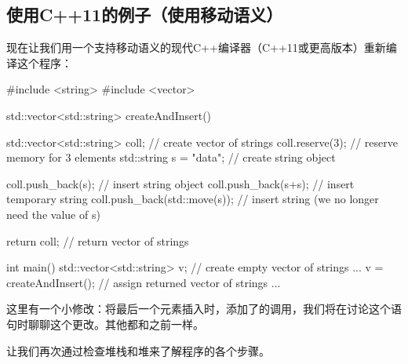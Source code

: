 \subsection{使用C++11的例子（使用移动语义）}

现在让我们用一个支持移动语义的现代C++编译器（C++11或更高版本）重新编译这个程序：

\begin{cppcode}
#include <string>
#include <vector>

std::vector<std::string> createAndInsert()
{
	std::vector<std::string> coll; // create vector of strings
	coll.reserve(3); // reserve memory for 3 elements
	std::string s = "data"; // create string object

	coll.push_back(s); // insert string object
	coll.push_back(s+s); // insert temporary string
	coll.push_back(std::move(s)); // insert string (we no longer need the value of s)

	return coll; // return vector of strings
}

int main()
{
	std::vector<std::string> v; // create empty vector of strings
	...
	v = createAndInsert(); // assign returned vector of strings
	...
}
\end{cppcode}

这里有一个小修改：将最后一个元素插入时，添加了的调用，我们将在讨论这个语句时聊聊这个更改。其他都和之前一样。

让我们再次通过检查堆栈和堆来了解程序的各个步骤。

